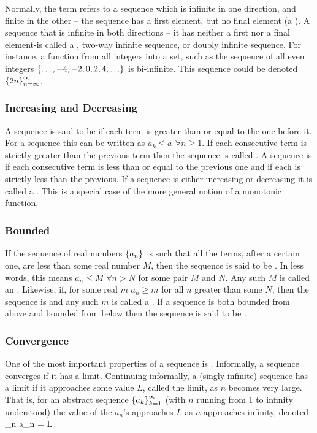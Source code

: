 Normally, the term  refers to a sequence which is infinite in one direction, and finite in the other -- the sequence has a first element, but no final element (a ). A sequence that is infinite in both directions -- it has neither a first nor a final element-is called a , two-way infinite sequence, or doubly infinite sequence. For instance, a function from all integers into a set, such as the sequence of all even integers $\left\lbrace{\dotsc, -4,-2,0,2,4,\dotsc}\right\rbrace$ is bi-infinite. This sequence could be denoted $\left\lbrace{{2n}}\right\rbrace_{n=\infty}^{\infty}$.


\subsubsection{Increasing and Decreasing}
A sequence is said to be  if each term is greater than or equal to the one before it. For a sequence  this can be written as $a_k \leq a_{}$ $\forall n\geq 1$. If each consecutive term is strictly greater than the previous term then the sequence is called . A sequence is  if each consecutive term is less than or equal to the previous one and  if each is strictly less than the previous. If a sequence is either increasing or decreasing it is called a . This is a special case of the more general notion of a monotonic function.


\subsubsection{Bounded}
If the sequence of real numbers $\left\lbrace{{a_n}}\right\rbrace_{}^{}$ is such that all the terms, after a certain one, are less than some real number $M$, then the sequence is said to be . In less words, this means $a_n\leq M$ $\forall n > N$ for some pair $M$ and $N$. Any such $M$ is called an . Likewise, if, for some real $m$ $a_n \geq m$ for all $n$ greater than some $N$, then the sequence is  and any such $m$ is called a . If a sequence is both bounded from above and bounded from below then the sequence is said to be .


\subsubsection{Convergence}
One of the most important properties of a sequence is . Informally, a sequence converges if it has a limit. Continuing informally, a (singly-infinite) sequence has a limit if it approaches some value $L$, called the limit, as $n$ becomes very large. That is, for an abstract sequence $\left\lbrace{{a_k}}\right\rbrace_{k=1}^{\infty}$ (with $n$ running from 1 to infinity understood) the value of the $a_n$'s approaches $L$ as $n$ approaches infinity, denoted
\beq
\lim_{n\to\infty} a_n = L\,.
\eeq

